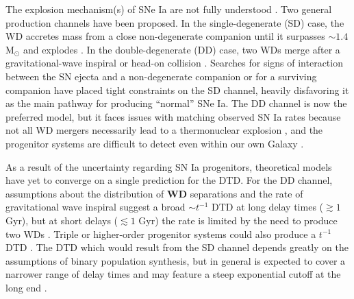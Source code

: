 \documentclass[twocolumn,twocolappendix,linenumbers]{aastex631}
\begin{document}
The explosion mechanism(s) of SNe Ia are not fully understood \citep[for reviews, see][]{Maoz2014-Review,Livio2018-ProgenitorReview,Ruiter2020-ProgenitorReview}. Two general production channels have been proposed. In the single-degenerate (SD) case, the WD accretes mass from a close non-degenerate companion until it surpasses $\sim1.4$ M$_\odot$ and explodes \citep{Whelan1973-SDModel,Nomoto1982-SDModel,Yoon2003-SDModel}. In the double-degenerate (DD) case, two WDs merge after a gravitational-wave inspiral \citep{Iben1984-IaBinary,Webbink1984-DDModel,Pakmor2012-WDMerger} or head-on collision \citep{Benz1989-CollisionalDD,Thompson2011-CollisionalDD}. Searches for signs of interaction between the SN ejecta and a non-degenerate companion \citep[e.g.,][]{Panagia2006-RadioEmission,Chomiuk2016-RadioEmission,Fausnaugh2019-EarlyIaLightCurves,Tucker2020-SNeIaSpectra,Dubay2022-SNeIaCSM} or for a surviving companion \citep[e.g.,][]{Schaefer2012-ExCompanionSNR,Do2021-Progenitor1972E,Tucker2023-SN2011fe} have placed tight constraints on the SD channel, heavily disfavoring it as the main pathway for producing ``normal'' SNe Ia. The DD channel is now the preferred model, but it faces issues with matching observed SN Ia rates because not all WD mergers necessarily lead to a thermonuclear explosion \citep[e.g.,][]{NomotoIben1985-DDMergers,SaioNomoto1998-DDMergers,Shen2012-DDMergers}, and the progenitor systems are difficult to detect even within our own Galaxy \citep{RebassaMansergas2019-WhereAreDDProgenitors}.

As a result of the uncertainty regarding SN Ia progenitors, theoretical models have yet to converge on a single prediction for the DTD. For the DD channel, assumptions about the distribution of {\bf WD} separations and the rate of gravitational wave inspiral suggest a broad $\sim t^{-1}$ DTD at long delay times ($\gtrsim 1$ Gyr), but at short delays ($\lesssim 1$ Gyr) the rate is limited by the need to produce two WDs {\bf \citep[see][]{Greggio2005-AnalyticalRates,Maoz2014-Review}}. Triple or higher-order progenitor systems could also produce a $t^{-1}$ DTD \citep{Fang2018-QuadrupleSystems,Rajamuthukumar2023-TripleEvolution}. The DTD which would result from the SD channel depends greatly on the assumptions of binary population synthesis, but in general is expected to cover a narrower range of delay times and may feature a steep exponential cutoff at the long end \citep[e.g.,][]{Greggio2005-AnalyticalRates}.
\end{document}
